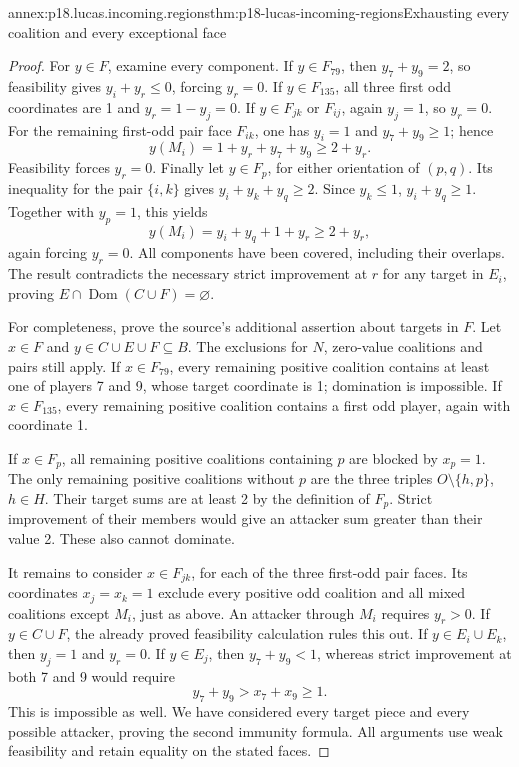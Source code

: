 \begin{annexitem}{annex:p18.lucas.incoming.regions}{thm:p18-lucas-incoming-regions}{Exhausting every coalition and every exceptional face}
\begin{proof}
For \(y\in F\), examine every component. If \(y\in F_{79}\),
then \(y_7+y_9=2\), so feasibility gives
\(y_i+y_r\leq0\), forcing \(y_r=0\).
If \(y\in F_{135}\), all three first odd coordinates are
1 and \(y_r=1-y_j=0\). If \(y\in F_{jk}\) or \(F_{ij}\),
again \(y_j=1\), so \(y_r=0\).
For the remaining first-odd pair face \(F_{ik}\), one has
\(y_i=1\) and \(y_7+y_9\geq1\); hence
\[
                     y(M_i)=1+y_r+y_7+y_9\geq2+y_r.
\]
Feasibility forces \(y_r=0\).
Finally let \(y\in F_p\), for either orientation of
\((p,q)\). Its inequality for the pair \(\{i,k\}\) gives
\(y_i+y_k+y_q\geq2\). Since \(y_k\leq1\),
\(y_i+y_q\geq1\). Together with \(y_p=1\), this yields
\[
                     y(M_i)=y_i+y_q+1+y_r\geq2+y_r,
\]
again forcing \(y_r=0\).
All components have been covered, including their overlaps.
The result contradicts the necessary strict improvement
at \(r\) for any target in \(E_i\), proving
\(E\cap\operatorname{Dom}(C\cup F)=\varnothing\).

For completeness, prove the source's additional assertion
about targets in \(F\). Let \(x\in F\) and
\(y\in C\cup E\cup F\subseteq B\). The exclusions for
\(N\), zero-value coalitions and pairs still apply.
If \(x\in F_{79}\), every remaining positive coalition
contains at least one of players 7 and 9, whose target
coordinate is 1; domination is impossible.
If \(x\in F_{135}\), every remaining positive coalition
contains a first odd player, again with coordinate 1.

If \(x\in F_p\), all remaining positive coalitions containing
\(p\) are blocked by \(x_p=1\).
The only remaining positive coalitions without \(p\) are
the three triples \(O\setminus\{h,p\}\), \(h\in H\).
Their target sums are at least 2 by the definition of
\(F_p\). Strict improvement of their members would give
an attacker sum greater than their value 2. These also
cannot dominate.

It remains to consider \(x\in F_{jk}\), for each of the
three first-odd pair faces. Its coordinates \(x_j=x_k=1\)
exclude every positive odd coalition and all mixed
coalitions except \(M_i\), just as above. An attacker
through \(M_i\) requires \(y_r>0\).
If \(y\in C\cup F\), the already proved feasibility
calculation rules this out. If \(y\in E_i\cup E_k\),
then \(y_j=1\) and \(y_r=0\). If \(y\in E_j\), then
\(y_7+y_9<1\), whereas strict improvement at both 7 and
9 would require
\[
                          y_7+y_9>x_7+x_9\geq1.
\]
This is impossible as well. We have considered every
target piece and every possible attacker, proving the
second immunity formula. All arguments use weak
feasibility and retain equality on the stated faces.
\end{proof}
\end{annexitem}

